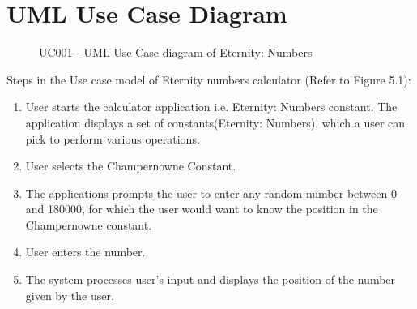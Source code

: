 \documentclass[12pt, a4paper]{report}
\begin{document}
\section{UML Use Case Diagram}
\begin{figure}
    \centering
    \caption{UC001 - UML Use Case diagram of Eternity: Numbers}
    \label{fig:UML Use Case diagram of Eternity: Numbers}
\end{figure}
Steps in the Use case model of Eternity numbers calculator (Refer to Figure 5.1):
\begin{enumerate}

    \item User starts the calculator application i.e. Eternity: Numbers constant. The application displays a set of constants(Eternity: Numbers), which a user can pick to perform various operations.
    \item User selects the Champernowne Constant.
    \item The applications prompts the user to enter any random number between 0 and 180000, for which the user would want to know the position in the Champernowne constant.
    \item User enters the number.
    \item The system processes user's input and displays the position of the number given by the user.
\end{enumerate}
\end{document}
